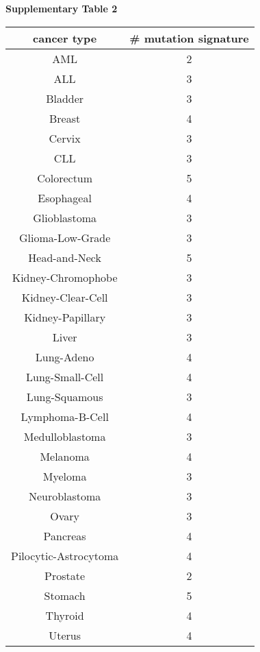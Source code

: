 \documentclass{article}
\begin{document}

\vspace*{1.0cm}
{\LARGE \bf Supplementary Table 2}
\vspace*{0.25cm}

\begin{table}[!b]
\begin{center}
\begin{tabular}{|c|c|} \hline
cancer type & \# mutation signature \\ \hline
AML & 2 \\ \hline
ALL & 3 \\ \hline
Bladder & 3 \\ \hline
Breast & 4 \\ \hline
Cervix & 3 \\ \hline
CLL & 3 \\ \hline
Colorectum & 5 \\ \hline
Esophageal & 4 \\ \hline
Glioblastoma & 3 \\ \hline
Glioma-Low-Grade & 3 \\ \hline
Head-and-Neck & 5 \\ \hline
Kidney-Chromophobe & 3 \\ \hline
Kidney-Clear-Cell & 3 \\ \hline
Kidney-Papillary & 3 \\ \hline
Liver & 3 \\ \hline
Lung-Adeno & 4 \\ \hline
Lung-Small-Cell & 4 \\ \hline
Lung-Squamous & 3 \\ \hline
Lymphoma-B-Cell & 4 \\ \hline
Medulloblastoma & 3 \\ \hline
Melanoma & 4 \\ \hline
Myeloma & 3 \\ \hline
Neuroblastoma & 3 \\ \hline
Ovary & 3 \\ \hline
Pancreas & 4 \\ \hline
Pilocytic-Astrocytoma & 4 \\ \hline
Prostate & 2 \\ \hline
Stomach & 5 \\ \hline
Thyroid & 4 \\ \hline
Uterus & 4 \\ \hline
\end{tabular}
\end{center}
\label{tab_rep}
\end{table}
\end{document}
